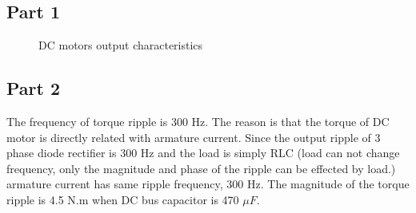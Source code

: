 \documentclass[fleqn, a4paper]{report}
\begin{document}
\subsection*{Part 1}
\begin{figure}[H]%
    \centering
    \qquad
    \qquad
    \caption{DC motors output characteristics}%
    \label{fig:example}%
\end{figure}
\subsection*{Part 2}
The frequency of torque ripple is 300 Hz. The reason is that the torque of DC motor is directly related with armature current. Since the output ripple of 3 phase diode rectifier is 300 Hz and the load is simply RLC (load can not change frequency, only the magnitude and phase of the ripple can be effected by load.) armature current has same ripple frequency, 300 Hz. 
The magnitude of the torque ripple is 4.5 N.m when DC bus capacitor is 470 $\mu F$.
\end{document}
